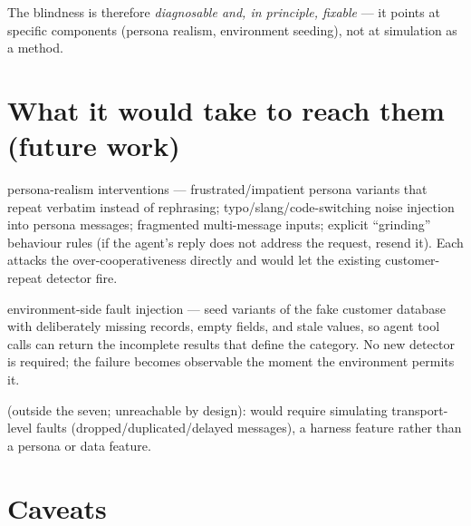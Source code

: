 \documentclass[11pt,a4paper]{article}
\newcommand{\cat}[1]{\texttt{#1}}
\begin{document}
\noindent
The blindness is therefore \emph{diagnosable and, in principle, fixable} --- it points at specific
components (persona realism, environment seeding), not at simulation as a method.

\section{What it would take to reach them (future work)}
\label{sec:future}

\begin{description}[leftmargin=1.2em, itemsep=3pt]
  \item[\cat{comprehension}:] persona-realism interventions --- frustrated/impatient persona
        variants that repeat verbatim instead of rephrasing; typo/slang/code-switching noise
        injection into persona messages; fragmented multi-message inputs; explicit ``grinding''
        behaviour rules (if the agent's reply does not address the request, resend it). Each
        attacks the over-cooperativeness directly and would let the existing customer-repeat
        detector fire.
  \item[\cat{data\_gap}:] environment-side fault injection --- seed variants of the fake customer
        database with deliberately missing records, empty fields, and stale values, so agent tool
        calls can return the incomplete results that define the category. No new detector is
        required; the failure becomes observable the moment the environment permits it.
  \item[\cat{delivery\_infra}] (outside the seven; unreachable by design): would require
        simulating transport-level faults (dropped/duplicated/delayed messages), a harness feature
        rather than a persona or data feature.
\end{description}

\section{Caveats}
\end{document}

